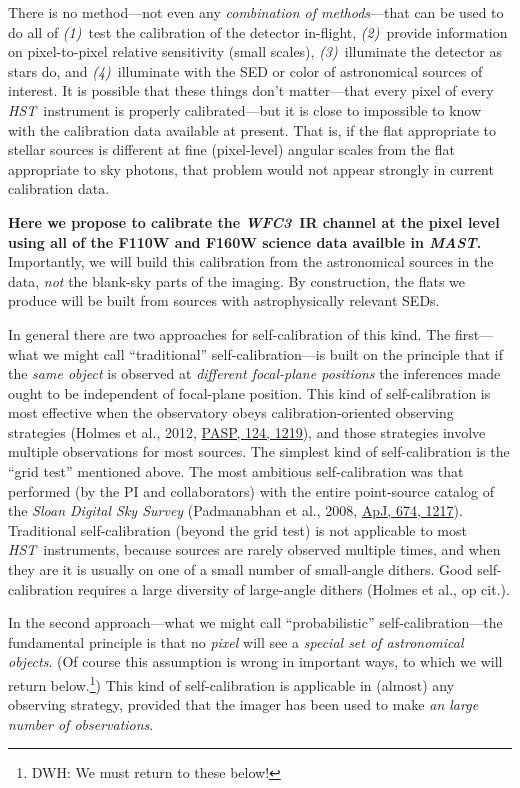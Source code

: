 \documentclass[12pt]{article}
\newcommand{\project}[1]{\textsl{#1}}
\newcommand{\HST}{\project{HST}}
\newcommand{\WFC}{\project{WFC3}}
\newcommand{\MAST}{\project{MAST}}
\begin{document}
There is no method---not even any \emph{combination of methods}---that
can be used to do all of \textsl{(1)}~test the calibration of the
detector in-flight, \textsl{(2)}~provide information on pixel-to-pixel
relative sensitivity (small scales), \textsl{(3)}~illuminate the
detector as stars do, and \textsl{(4)}~illuminate with the SED or
color of astronomical sources of interest.  It is possible that these
things don't matter---that every pixel of every \HST\ instrument is
properly calibrated---but it is close to impossible to know with the
calibration data available at present.  That is, if the flat
appropriate to stellar sources is different at fine (pixel-level)
angular scales from the flat appropriate to sky photons, that problem
would not appear strongly in current calibration data.

\textbf{Here we propose to calibrate the \WFC\ IR channel at the pixel
  level using all of the F110W and F160W science data availble in \MAST.}
Importantly, we will build this calibration from the astronomical
sources in the data, \emph{not} the blank-sky parts of the imaging.
By construction, the flats we produce will be built from sources with
astrophysically relevant SEDs.

In general there are two approaches for self-calibration of this kind.
The first---what we might call ``traditional'' self-calibration---is
built on the principle that if the \emph{same object} is observed at
\emph{different focal-plane positions} the inferences made ought to be
independent of focal-plane position.  This kind of self-calibration is
most effective when the observatory obeys calibration-oriented
observing strategies (Holmes et al., 2012,
\href{http://bit.ly/15TAoYy}{PASP, 124, 1219}), and those strategies
involve multiple observations for most sources.  The simplest kind of
self-calibration is the ``grid test'' mentioned above.  The most
ambitious self-calibration was that performed (by the PI and
collaborators) with the entire point-source catalog of the
\project{Sloan Digital Sky Survey} (Padmanabhan et al., 2008,
\href{http://bit.ly/12dPkSh}{ApJ, 674, 1217}).  Traditional
self-calibration (beyond the grid test) is not applicable to most
\HST\ instruments, because sources are rarely observed multiple times,
and when they are it is usually on one of a small number of
small-angle dithers.  Good self-calibration requires a large diversity
of large-angle dithers (Holmes et al., op cit.).

In the second approach---what we might call ``probabilistic''
self-calibration---the fundamental principle is that no \emph{pixel}
will see a \emph{special set of astronomical objects}.  (Of course
this assumption is wrong in important ways, to which we will return
below.\footnote{\color{red} DWH: We must return to these below!})  This kind of
self-calibration is applicable in (almost) any observing strategy,
provided that the imager has been used to make \emph{an large
  number of observations}.
\end{document}
